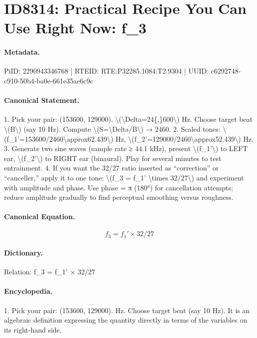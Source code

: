\section*{ID8314: Practical Recipe You Can Use Right Now: f\_3}
\paragraph{Metadata.}
PiID: 2290943346768 | RTEID: RTE:P32285.1084:T2.9304 | UUID: c6292748-c910-50b4-ba0e-661e35ae6c9c

\paragraph{Canonical Statement.}
1. Pick your pair: (153600, 129000). \textbackslash{}(\textbackslash{}Delta=24\{,\}600\textbackslash{}) Hz. Choose target beat \textbackslash{}(B\textbackslash{}) (say 10 Hz). Compute \textbackslash{}(S=\textbackslash{}Delta/B\textbackslash{}) → 2460. 2. Scaled tones: \textbackslash{}(f\_1'=153600/2460\textbackslash{}approx62.439\textbackslash{}) Hz, \textbackslash{}(f\_2'=129000/2460\textbackslash{}approx52.439\textbackslash{}) Hz. 3. Generate two sine waves (sample rate ≥ 44.1 kHz), present \textbackslash{}(f\_1'\textbackslash{}) to LEFT ear, \textbackslash{}(f\_2'\textbackslash{}) to RIGHT ear (binaural). Play for several minutes to test entrainment. 4. If you want the 32/27 ratio inserted as “correction” or “canceller,” apply it to one tone: \textbackslash{}(f\_3 = f\_1' \textbackslash{}times 32/27\textbackslash{}) and experiment with amplitude and phase. Use phase = π (180°) for cancellation attempts; reduce amplitude gradually to find perceptual smoothing versus roughness.

\paragraph{Canonical Equation.}
\[
f_3 = f_1' \times 32/27
\]

\paragraph{Dictionary.}
Relation: f\_3 = f\_1' × 32/27

\paragraph{Encyclopedia.}
1. Pick your pair: (153600, 129000). Hz. Choose target beat (say 10 Hz). It is an algebraic definition expressing the quantity directly in terms of the variables on its right-hand side.
